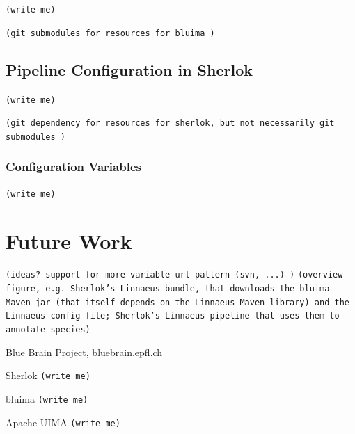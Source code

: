 \documentclass{article}
\newcommand{\TODO}[1]{\texttt{\textcolor{YellowOrange}{(#1)}}} %
\begin{document}
\TODO{write me}

\TODO{git submodules for resources for bluima }

\subsection{Pipeline Configuration in Sherlok}

\TODO{write me}

\TODO{git dependency for resources for sherlok, but not necessarily git submodules }

\subsubsection{Configuration Variables}

\TODO{write me}

\section{Future Work}

\TODO{ideas? support for more variable url pattern (svn, ...) }
\TODO{overview figure, e.g.  Sherlok's Linnaeus bundle, that downloads the bluima Maven jar (that itself depends on the Linnaeus Maven library) and the Linnaeus config file; Sherlok's Linnaeus pipeline that uses them to annotate species}

\begin{thebibliography}{9}

    Blue Brain Project,
    \href{http://bluebrain.epfl.ch/}{bluebrain.epfl.ch}

    Sherlok
    \TODO{write me}

    bluima
    \TODO{write me}

    Apache UIMA
    \TODO{write me}
\end{thebibliography}

\end{document}
